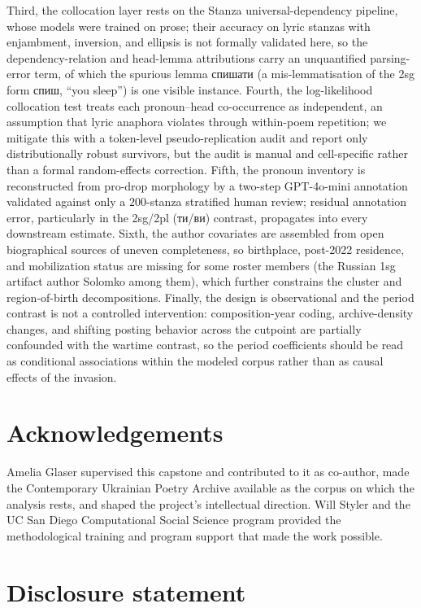 \documentclass[12pt]{interact}
\theoremstyle{plain}%
\theoremstyle{definition}
\theoremstyle{remark}
\begin{document}
Third, the collocation layer rests on the Stanza universal-dependency pipeline, whose models were trained on prose; their accuracy on lyric stanzas with enjambment, inversion, and ellipsis is not formally validated here, so the dependency-relation and head-lemma attributions carry an unquantified parsing-error term, of which the spurious lemma \textukrainian{спишати} (a mis-lemmatisation of the 2sg form \textukrainian{спиш}, ``you sleep'') is one visible instance. Fourth, the log-likelihood collocation test treats each pronoun--head co-occurrence as independent, an assumption that lyric anaphora violates through within-poem repetition; we mitigate this with a token-level pseudo-replication audit and report only distributionally robust survivors, but the audit is manual and cell-specific rather than a formal random-effects correction. Fifth, the pronoun inventory is reconstructed from pro-drop morphology by a two-step GPT-4o-mini annotation validated against only a $200$-stanza stratified human review; residual annotation error, particularly in the 2sg/2pl ({\ukrainianfont ти}/{\ukrainianfont ви}) contrast, propagates into every downstream estimate. Sixth, the author covariates are assembled from open biographical sources of uneven completeness, so birthplace, post-2022 residence, and mobilization status are missing for some roster members (the Russian 1sg artifact author Solomko among them), which further constrains the cluster and region-of-birth decompositions. Finally, the design is observational and the period contrast is not a controlled intervention: composition-year coding, archive-density changes, and shifting posting behavior across the cutpoint are partially confounded with the wartime contrast, so the period coefficients should be read as conditional associations within the modeled corpus rather than as causal effects of the invasion.

\section*{Acknowledgements}

Amelia Glaser supervised this capstone and contributed to it as co-author, made the Contemporary Ukrainian Poetry Archive available as the corpus on which the analysis rests, and shaped the project's intellectual direction. Will Styler and the UC San Diego Computational Social Science program provided the methodological training and program support that made the work possible.


\section*{Disclosure statement}
\end{document}
